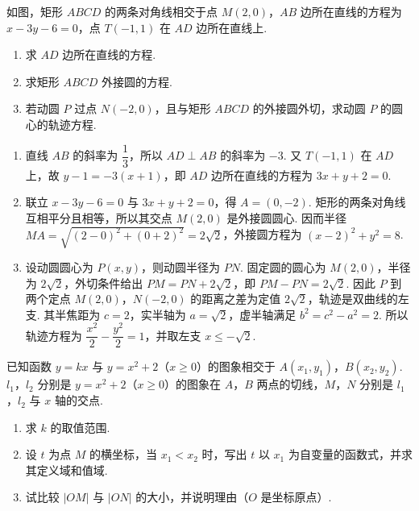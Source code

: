 \begin{problem}
如图，矩形 \(ABCD\) 的两条对角线相交于点 \(M(2,0)\)，\(AB\) 边所在直线的方程为 \(x - 3y - 6 = 0\)，点 \(T(-1,1)\) 在 \(AD\) 边所在直线上.

\begin{enumerate}
\item 求 \(AD\) 边所在直线的方程.
\item 求矩形 \(ABCD\) 外接圆的方程.
\item 若动圆 \(P\) 过点 \(N(-2,0)\)，且与矩形 \(ABCD\) 的外接圆外切，求动圆 \(P\) 的圆心的轨迹方程.
\end{enumerate}

\end{problem}

\begin{solution}
\begin{enumerate}
\item 直线 \(AB\) 的斜率为 \(\dfrac13\)，所以 \(AD\perp AB\) 的斜率为 \(-3\). 又 \(T(-1,1)\) 在 \(AD\) 上，故 \(y-1=-3(x+1)\)，即 \(AD\) 边所在直线的方程为 \(3x+y+2=0\).
\item 联立 \(x-3y-6=0\) 与 \(3x+y+2=0\)，得 \(A=(0,-2)\). 矩形的两条对角线互相平分且相等，所以其交点 \(M(2,0)\) 是外接圆圆心. 因而半径 \(MA=\sqrt{(2-0)^2+(0+2)^2}=2\sqrt2\)，外接圆方程为 \(\left(x-2\right)^2+y^2=8\).
\item 设动圆圆心为 \(P(x,y)\)，则动圆半径为 \(PN\). 固定圆的圆心为 \(M(2,0)\)，半径为 \(2\sqrt2\)，外切条件给出 \(PM=PN+2\sqrt2\)，即 \(PM-PN=2\sqrt2\). 因此 \(P\) 到两个定点 \(M(2,0)\)，\(N(-2,0)\) 的距离之差为定值 \(2\sqrt2\)，轨迹是双曲线的左支. 其半焦距为 \(c=2\)，实半轴为 \(a=\sqrt2\)，虚半轴满足 \(b^2=c^2-a^2=2\). 所以轨迹方程为
\(\dfrac{x^2}{2}-\dfrac{y^2}{2}=1\)，并取左支 \(x\leqslant-\sqrt2\).
\end{enumerate}
\end{solution}

\begin{problem}
已知函数 \(y = kx\) 与 \(y = x^2 + 2\)（\(x \geqslant 0\)）的图象相交于 \(A(x_1, y_1)\)，\(B(x_2, y_2)\). \(l_1\)，\(l_2\) 分别是 \(y = x^2 + 2\)（\(x \geqslant 0\)）的图象在 \(A\)，\(B\) 两点的切线，\(M\)，\(N\) 分别是 \(l_1\)，\(l_2\) 与 \(x\) 轴的交点.

\begin{enumerate}
\item 求 \(k\) 的取值范围.
\item 设 \(t\) 为点 \(M\) 的横坐标，当 \(x_{1} < x_{2}\) 时，写出 \(t\) 以 \(x_{1}\) 为自变量的函数式，并求其定义域和值域.
\item 试比较 \(|OM|\) 与 \(|ON|\) 的大小，并说明理由（\(O\) 是坐标原点）.
\end{enumerate}
\end{problem}

